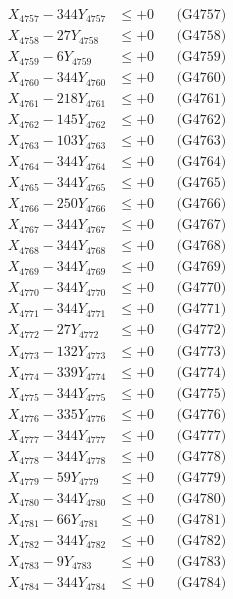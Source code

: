 \documentclass[a4paper,10pt]{article}
\begin{document}
{\begin{align}
X_{4757} - 344Y_{4757} &\leq +0 && \text{(G4757)} \\
X_{4758} - 27Y_{4758} &\leq +0 && \text{(G4758)} \\
X_{4759} - 6Y_{4759} &\leq +0 && \text{(G4759)} \\
X_{4760} - 344Y_{4760} &\leq +0 && \text{(G4760)} \\
\allowbreak
X_{4761} - 218Y_{4761} &\leq +0 && \text{(G4761)} \\
X_{4762} - 145Y_{4762} &\leq +0 && \text{(G4762)} \\
X_{4763} - 103Y_{4763} &\leq +0 && \text{(G4763)} \\
X_{4764} - 344Y_{4764} &\leq +0 && \text{(G4764)} \\
X_{4765} - 344Y_{4765} &\leq +0 && \text{(G4765)} \\
X_{4766} - 250Y_{4766} &\leq +0 && \text{(G4766)} \\
X_{4767} - 344Y_{4767} &\leq +0 && \text{(G4767)} \\
X_{4768} - 344Y_{4768} &\leq +0 && \text{(G4768)} \\
X_{4769} - 344Y_{4769} &\leq +0 && \text{(G4769)} \\
X_{4770} - 344Y_{4770} &\leq +0 && \text{(G4770)} \\
\allowbreak
X_{4771} - 344Y_{4771} &\leq +0 && \text{(G4771)} \\
X_{4772} - 27Y_{4772} &\leq +0 && \text{(G4772)} \\
X_{4773} - 132Y_{4773} &\leq +0 && \text{(G4773)} \\
X_{4774} - 339Y_{4774} &\leq +0 && \text{(G4774)} \\
X_{4775} - 344Y_{4775} &\leq +0 && \text{(G4775)} \\
X_{4776} - 335Y_{4776} &\leq +0 && \text{(G4776)} \\
X_{4777} - 344Y_{4777} &\leq +0 && \text{(G4777)} \\
X_{4778} - 344Y_{4778} &\leq +0 && \text{(G4778)} \\
X_{4779} - 59Y_{4779} &\leq +0 && \text{(G4779)} \\
X_{4780} - 344Y_{4780} &\leq +0 && \text{(G4780)} \\
\allowbreak
X_{4781} - 66Y_{4781} &\leq +0 && \text{(G4781)} \\
X_{4782} - 344Y_{4782} &\leq +0 && \text{(G4782)} \\
X_{4783} - 9Y_{4783} &\leq +0 && \text{(G4783)} \\
X_{4784} - 344Y_{4784} &\leq +0 && \text{(G4784)} \\

\end{align}}
\end{document}
